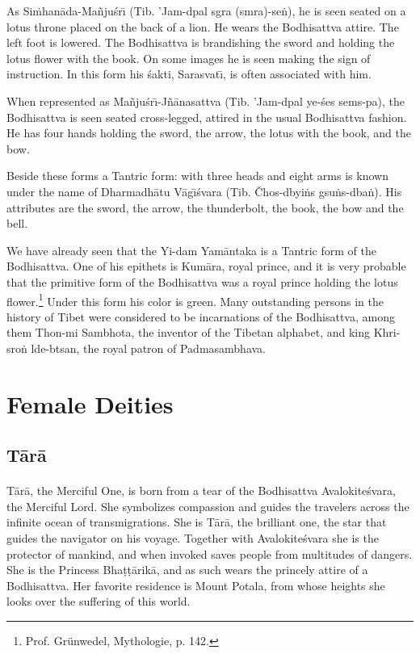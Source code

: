 \documentclass[a4paper, 12pt, oneside]{article}
\begin{document}
As Si\.{m}han\={a}da-Ma\~{n}ju\'{s}r\={\i} (Tib. 'Jam-dpal sgra (smra)-se\.{n}), he is seen seated on a lotus throne placed on the back of a lion. He wears the Bodhisattva attire. The left foot is lowered. The Bodhisattva is brandishing the sword and holding the lotus flower with the book. On some images he is seen making the sign of instruction. In this form his \'{s}akti, Sarasvat\={\i}, is often associated with him.

When represented as Ma\~{n}ju\'{s}r\={\i}-J\~{n}\={a}nasattva (Tib. 'Jam-dpal ye-\'{s}es sems-pa), the Bodhisattva is seen seated cross-legged, attired in the usual Bodhisattva fashion. He has four hands holding the sword, the arrow, the lotus with the book, and the bow.

Beside these forms a Tantric form: with three heads and eight arms is known under the name of Dharmadh\={a}tu V\={a}g\={\i}\'{s}vara (Tib. Čhos-dbyi\.{n}s gsu\.{n}s-dba\.{n}). His attributes are the sword, the arrow, the thunderbolt, the book, the bow and the bell.

We have already seen that the Yi-dam Yam\={a}ntaka is a Tantric form of the Bodhisattva. One of his epithets is Kum\={a}ra, royal prince, and it is very probable that the primitive form of the Bodhisattva was a royal prince holding the lotus flower.\footnote{Prof. Grünwedel, Mythologie, p. 142.} Under this form his color is green. Many outstanding persons in the history of Tibet were considered to be incarnations of the Bodhisattva, among them Thon-mi Sambhota, the inventor of the Tibetan alphabet, and king Khri-sro\.{n} lde-btsan, the royal patron of Padmasambhava.
\clearpage
\section{Female Deities}

\subsection{T\={a}r\={a}}
\paragraph{}
T\={a}r\={a}, the Merciful One, is born from a tear of the Bodhisattva Avalokite\'{s}vara, the Merciful Lord. She symbolizes compassion and guides the travelers across the infinite ocean of transmigrations. She is T\={a}r\={a}, the brilliant one, the star that guides the navigator on his voyage. Together with Avalokite\'{s}vara she is the protector of mankind, and when invoked saves people from multitudes of dangers. She is the Princess Bha\d{t}\d{t}\={a}rik\={a}, and as such wears the princely attire of a Bodhisattva. Her favorite residence is Mount Potala, from whose heights she looks over the suffering of this world.
\end{document}
